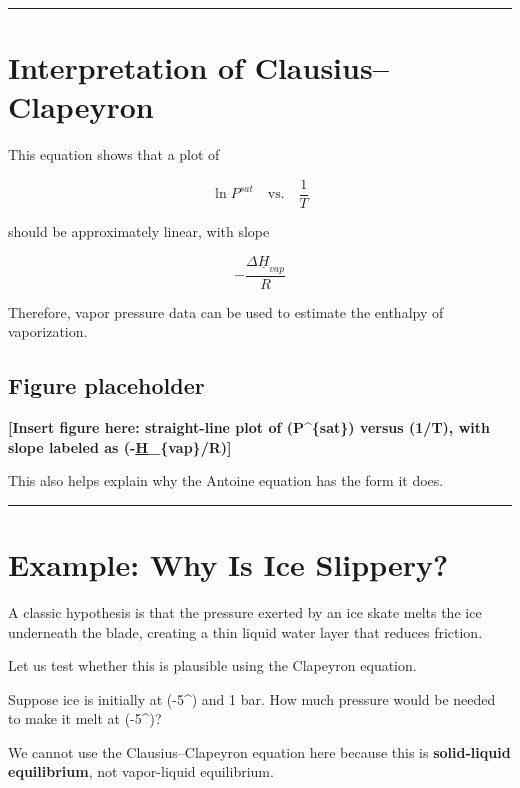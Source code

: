 \documentclass[
  letterpaper,
  DIV=11,
  numbers=noendperiod]{scrartcl}
\begin{document}
\begin{center}\rule{0.5\linewidth}{0.5pt}\end{center}

\section{Interpretation of
Clausius--Clapeyron}\label{interpretation-of-clausiusclapeyron}

This equation shows that a plot of

\[
\ln P^{sat} \quad \text{vs.} \quad \frac{1}{T}
\]

should be approximately linear, with slope

\[
-\frac{\Delta \underline{H}_{vap}}{R}
\]

Therefore, vapor pressure data can be used to estimate the enthalpy of
vaporization.

\subsection{Figure placeholder}\label{figure-placeholder-2}

\textbf{{[}Insert figure here: straight-line plot of (\ln P\^{}\{sat\})
versus (1/T), with slope labeled as
(-\Delta \underline{H}\_\{vap\}/R){]}}

This also helps explain why the Antoine equation has the form it does.

\begin{center}\rule{0.5\linewidth}{0.5pt}\end{center}

\section{Example: Why Is Ice
Slippery?}\label{example-why-is-ice-slippery}

A classic hypothesis is that the pressure exerted by an ice skate melts
the ice underneath the blade, creating a thin liquid water layer that
reduces friction.

Let us test whether this is plausible using the Clapeyron equation.

Suppose ice is initially at (-5\^{}\circ{}) and 1 bar. How much
pressure would be needed to make it melt at (-5\^{}\circ{})?

We cannot use the Clausius--Clapeyron equation here because this is
\textbf{solid-liquid equilibrium}, not vapor-liquid equilibrium.
\end{document}
